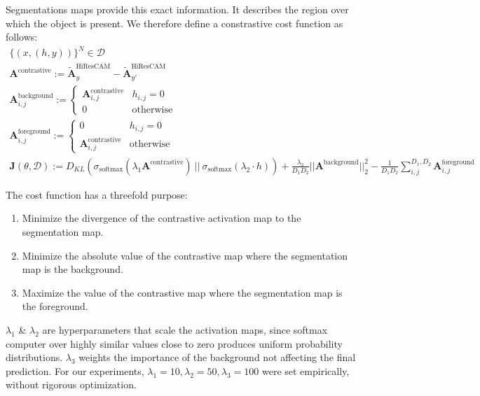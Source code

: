 \documentclass{article}
\begin{document}
Segmentations maps provide this exact information. It describes the region over which the object is present. We therefore define a constrastive cost function as follows:
\begin{gather}
	\{(x, (h, y))\}^N \in \mathcal{D} \\
	\mathcal{\bm{A}}^{\text{contrastive}} := \tilde{\mathcal{\bm{A}}}_{y}^{\text{HiResCAM}} - \tilde{\mathcal{\bm{A}}}_{y'}^{\text{HiResCAM}} \\
	\mathcal{\bm{A}}^{\text{background}}_{i,j} := \begin{cases}
		\mathcal{\bm{A}}^{\text{contrastive}}_{i,j} & h_{i,j} = 0 \\
		0 & \text{otherwise}
	\end{cases} \\
	\mathcal{\bm{A}}^{\text{foreground}}_{i,j} := \begin{cases}
		0 & h_{i,j} = 0 \\
		\mathcal{\bm{A}}^{\text{contrastive}}_{i,j} & \text{otherwise}
	\end{cases} \\
	\mathcal{\bm{J}}(\theta, \mathcal{D}) := D_{KL}(\sigma_{\text{softmax}}(\lambda_1 \mathcal{\bm{A}}^{\text{contrastive}})\ ||\ \sigma_{\text{softmax}}(\lambda_2 \cdot h)) + \frac{\lambda_3}{D_1 D_2} ||\mathcal{\bm{A}}^{\text{background}}||^2_2 - \frac{1}{D_1 D_2} \sum^{D_1,D_2}_{i,j} \mathcal{\bm{A}}^{\text{foreground}}_{i,j}
\end{gather}

The cost function has a threefold purpose:
\begin{enumerate}
	\item Minimize the divergence of the contrastive activation map to the segmentation map.
	\item Minimize the absolute value of the contrastive map where the segmentation map is the background.
	\item Maximize the value of the contrastive map where the segmentation map is the foreground.
\end{enumerate}

$\lambda_1$ \& $\lambda_2$ are hyperparameters that scale the activation maps, since softmax computer over highly similar values close to zero produces uniform probability distributions. $\lambda_3$ weights the importance of the background not affecting the final prediction. For our experiments, $\lambda_1 = 10, \lambda_2 = 50, \lambda_3 = 100$ were set empirically, without rigorous optimization.
\end{document}
